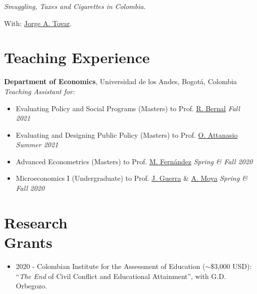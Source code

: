 \documentclass[margin,line]{res}
\newenvironment{list1}{
  \begin{list}{\ding{113}}{%
      \setlength{\itemsep}{0in}
      \setlength{\parsep}{0in} \setlength{\parskip}{0in}
      \setlength{\topsep}{0in} \setlength{\partopsep}{0in} 
      \setlength{\leftmargin}{0.17in}}}{\end{list}}
\begin{document}
\begin{resume}
\textit{Smuggling, Taxes and Cigarettes in Colombia}.
\begin{list1}
    \item[] With: \href{https://sites.google.com/view/jorgetovar/home}{Jorge A. Tovar}.
\end{list1}


\vspace{.1cm}

\section{\sc Teaching Experience}

{\bf Department of Economics}, Universidad de los Andes, Bogotá, Colombia \\
{\em Teaching Assistant for:} \\
\vspace{-.3cm}
\begin{itemize}
    \item Evaluating Policy and Social Programs (Masters) to Prof. \href{https://sites.google.com/view/raquelbernal/home}{R. Bernal}  \hfill \emph{Fall 2021}
    \item Evaluating and Designing Public Policy (Masters) to Prof. \href{http://www.orazioattanasio.org/}{O. Attanasio}  \hfill \emph{Summer 2021}
    \item Advanced Econometrics (Masters) to Prof. \href{https://sites.google.com/view/manuelfernandezsierra}{M. Fernández} \hfill \emph{Spring  \& Fall 2020}
    \item Microeconomics I (Undergraduate) to Prof. \href{https://jguerraforero.wixsite.com/joseaguerra}{J. Guerra} \& \href{https://sites.google.com/view/andresmoya}{A. Moya} \hfill \emph{Spring \& Fall 2020}

\end{itemize}



\section{\sc Research \\ Grants} 
\begin{itemize}
    \item 2020 - Colombian Institute for the Assessment of Education ($\sim$\$3,000 USD): ``\textit{The End} of Civil Conflict and Educational Attainment'', with G.D. Orbegozo.
\end{itemize}


\end{resume}
\end{document}
